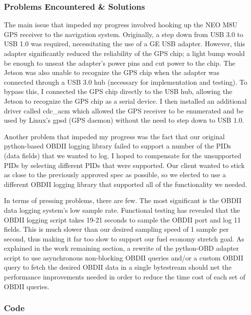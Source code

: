 \documentclass[onecolumn, draftclsnofoot,10pt, compsoc]{IEEEtran}
\begin{document}
\subsubsection{Problems Encountered \& Solutions}
The main issue that impeded my progress involved hooking up the NEO M8U GPS receiver to the navigation system. Originally, a step down from USB 3.0 to USB 1.0 was required, necessitating the use of a GE USB adapter. However, this adapter significantly reduced the reliability of the GPS chip; a light bump would be enough to unseat the adapter's power pins and cut power to the chip. The Jetson was also unable to recognize the GPS chip when the adapter was connected through a USB 3.0 hub (necessary for implementation and testing). To bypass this, I connected the GPS chip directly to the USB hub, allowing the Jetson to recognize the GPS chip as a serial device. I then installed an additional driver called cdc\_acm which allowed the GPS receiver to be enumerated and be used by Linux's gpsd (GPS daemon) without the need to step down to USB 1.0.\par
Another problem that impeded my progress was the fact that our original python-based OBDII logging library failed to support a number of the PIDs (data fields) that we wanted to log. I hoped to compensate for the unsupported PIDs by selecting different PIDs that were supported. Our client wanted to stick as close to the previously approved spec as possible, so we elected to use a different OBDII logging library that supported all of the functionality we needed.\par
In terms of pressing problems, there are few. The most significant is the OBDII data logging system's low sample rate. Functional testing has revealed that the OBDII logging script takes 19-21 seconds to sample the OBDII port and log 11 fields. This is much slower than our desired sampling speed of 1 sample per second, thus making it far too slow to support our fuel economy stretch goal. As explained in the work remaining section, a rewrite of the python-OBD adapter script to use asynchronous non-blocking OBDII queries and/or a custom OBDII query to fetch the desired OBDII data in a single bytestream should net the performance improvements needed in order to reduce the time cost of each set of OBDII queries.\par

\subsubsection{Code}
\end{document}
